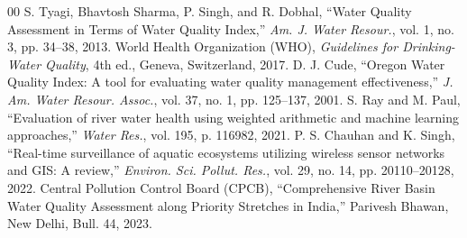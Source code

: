 \documentclass[conference]{IEEEtran}
\begin{document}
\begin{thebibliography}{00}
 S. Tyagi, Bhavtosh Sharma, P. Singh, and R. Dobhal, ``Water Quality Assessment in Terms of Water Quality Index,'' \textit{Am. J. Water Resour.}, vol. 1, no. 3, pp. 34--38, 2013.
 World Health Organization (WHO), \textit{Guidelines for Drinking-Water Quality}, 4th ed., Geneva, Switzerland, 2017.
 D. J. Cude, ``Oregon Water Quality Index: A tool for evaluating water quality management effectiveness,'' \textit{J. Am. Water Resour. Assoc.}, vol. 37, no. 1, pp. 125--137, 2001.
 S. Ray and M. Paul, ``Evaluation of river water health using weighted arithmetic and machine learning approaches,'' \textit{Water Res.}, vol. 195, p. 116982, 2021.
 P. S. Chauhan and K. Singh, ``Real-time surveillance of aquatic ecosystems utilizing wireless sensor networks and GIS: A review,'' \textit{Environ. Sci. Pollut. Res.}, vol. 29, no. 14, pp. 20110--20128, 2022.
 Central Pollution Control Board (CPCB), ``Comprehensive River Basin Water Quality Assessment along Priority Stretches in India,'' Parivesh Bhawan, New Delhi, Bull. 44, 2023.
\end{thebibliography}
\end{document}

